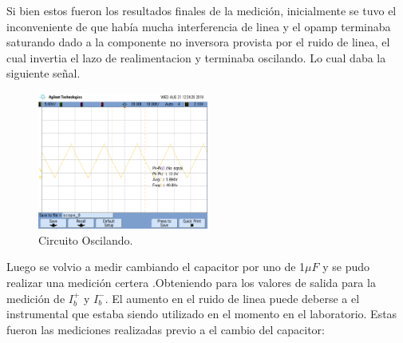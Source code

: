 \documentclass[a4paper]{article}
\begin{document}
Si bien estos fueron los resultados finales de la medición, inicialmente se tuvo el inconveniente de que había mucha interferencia de linea y el opamp terminaba saturando dado a la componente no inversora provista por el ruido de linea, el cual invertia el lazo de realimentacion y terminaba oscilando.
Lo cual daba la siguiente señal.
\begin{figure}[H]	
	\centering
	\includegraphics[width=0.5\textwidth]{imagenes/opmpOscilando.png}
	\caption{Circuito Oscilando.}
	\label{fig:oscilando}
\end{figure}
Luego se volvio a medir cambiando el capacitor por uno de 1$\mu F$ 
y  se pudo realizar una medición certera .Obteniendo para los valores de salida para la medición de $I_b^+$ y $I_b^-$. El aumento en el ruido de linea puede deberse a el instrumental que estaba siendo utilizado en el momento en el laboratorio.
Estas fueron las mediciones realizadas previo a el cambio del capacitor:
\end{document}
